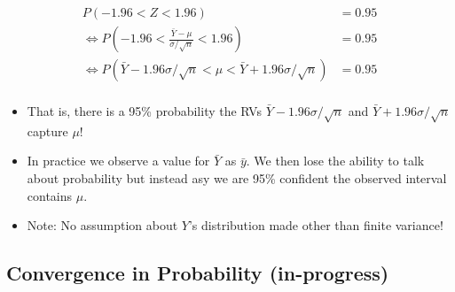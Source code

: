 \documentclass[
]{article}
\providecommand{\tightlist}{%
  \setlength{\itemsep}{0pt}\setlength{\parskip}{0pt}}
\begin{document}
\begin{align*}
P(-1.96<Z<1.96) &= 0.95\\
\Leftrightarrow P\left(-1.96<\frac{\bar{Y}-\mu}{\sigma/\sqrt{n}}<1.96\right) &= 0.95\\
\Leftrightarrow P\left(\bar{Y}-1.96\sigma/\sqrt{n}<\mu<\bar{Y}+1.96\sigma/\sqrt{n}\right) &= 0.95\\
\end{align*}

\begin{itemize}
\tightlist
\item
  That is, there is a 95\% probability the RVs
  \(\bar{Y}-1.96\sigma/\sqrt{n}\) and \(\bar{Y}+1.96\sigma/\sqrt{n}\)
  capture \(\mu\)!
\item
  In practice we observe a value for \(\bar{Y}\) as \(\bar{y}\). We then
  lose the ability to talk about probability but instead asy we are 95\%
  confident the observed interval contains \(\mu\).
\item
  Note: No assumption about \(Y\)'s distribution made other than finite
  variance!
\end{itemize}

\hypertarget{convergence-in-probability-in-progress}{%
\subsection{Convergence in Probability
(in-progress)}\label{convergence-in-probability-in-progress}}
\end{document}

